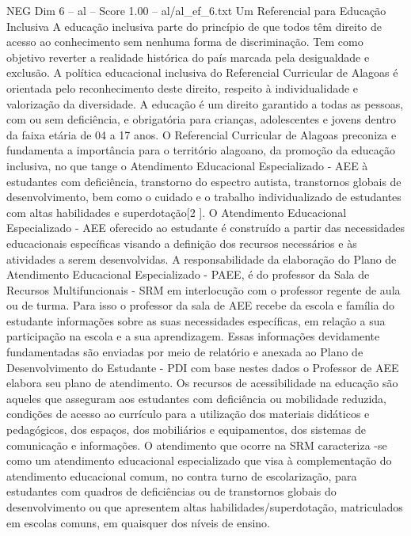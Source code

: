 \begin{textsample}{NEG Dim 6 – al – Score 1.00 – al/al\_ef\_6.txt}  \label{ex:f6_neg_064}
Um Referencial para Educação Inclusiva A educação inclusiva parte do princípio de que todos têm direito de acesso ao conhecimento sem nenhuma forma de discriminação.
Tem como objetivo reverter a realidade histórica do país marcada pela desigualdade e exclusão.
A política educacional inclusiva do Referencial Curricular de Alagoas é orientada pelo reconhecimento deste direito, respeito à individualidade e valorização da diversidade.
A educação é um direito garantido a todas as pessoas, com ou sem deficiência, e obrigatória para crianças, adolescentes e jovens dentro da faixa etária de 04 a 17 anos.
O Referencial Curricular de Alagoas preconiza e fundamenta a importância para o território alagoano, da promoção da educação inclusiva, no que tange o Atendimento Educacional Especializado - AEE à estudantes com deficiência, transtorno do espectro autista, transtornos globais de desenvolvimento, bem como o cuidado e o trabalho individualizado de estudantes com altas habilidades e superdotação[2 ].
O Atendimento Educacional Especializado - AEE oferecido ao estudante é construído a partir das necessidades educacionais específicas visando a definição dos recursos necessários e às atividades a serem desenvolvidas.
A responsabilidade da elaboração do Plano de Atendimento Educacional Especializado - PAEE, é do professor da Sala de Recursos Multifuncionais - SRM em interlocução com o professor regente de aula ou de turma.
Para isso o professor da sala de AEE recebe da escola e família do estudante informações sobre as suas necessidades específicas, em relação a sua participação na escola e a sua aprendizagem.
Essas informações devidamente fundamentadas são enviadas por meio de relatório e anexada ao Plano de Desenvolvimento do Estudante - PDI com base nestes dados o Professor de AEE elabora seu plano de atendimento.
Os recursos de acessibilidade na educação são aqueles que asseguram aos estudantes com deficiência ou mobilidade reduzida, condições de acesso ao currículo para a utilização dos materiais didáticos e pedagógicos, dos espaços, dos mobiliários e equipamentos, dos sistemas de comunicação e informações.
O atendimento que ocorre na SRM caracteriza -se como um atendimento educacional especializado que visa à complementação do atendimento educacional comum, no contra turno de escolarização, para estudantes com quadros de deficiências ou de transtornos globais do desenvolvimento ou que apresentem altas habilidades/superdotação, matriculados em escolas comuns, em quaisquer dos níveis de ensino.

\end{textsample}
